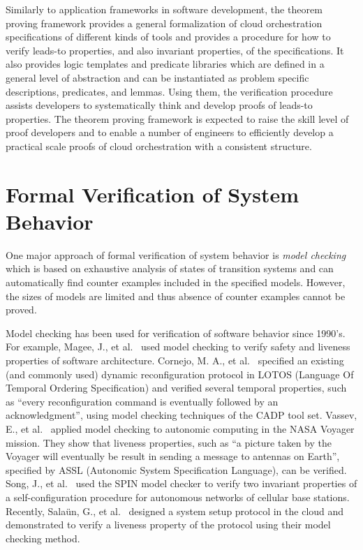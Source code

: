 \documentclass[12pt]{report}
\begin{document}
Similarly to application frameworks in software development, the
theorem proving framework provides a general formalization of cloud
orchestration specifications of different kinds of tools and provides
a procedure for how to verify leads-to properties, and also invariant
properties, of the specifications. It also provides logic templates
and predicate libraries which are defined in a general level of
abstraction and can be instantiated as problem specific descriptions,
predicates, and lemmas. Using them, the verification procedure assists
developers to systematically think and develop proofs of leads-to
properties.  The theorem proving framework is expected to raise the
skill level of proof developers and to enable a number of engineers to
efficiently develop a practical scale proofs of cloud orchestration
with a consistent structure.

\section{Formal Verification of System Behavior}
One major approach of formal verification of system behavior is {\it
  model checking} which is based on exhaustive analysis of states of
transition systems and can automatically find counter examples
included in the specified models. However, the sizes of models are
limited and thus absence of counter examples cannot be proved.

Model checking has been used for verification of software behavior
since 1990's.  For example, Magee, J., et al.~\cite{MageeKG99} used
model checking to verify safety and liveness properties of software
architecture. Cornejo, M. A., et al.~\cite{CornejoGMP01} specified an
existing (and commonly used) dynamic reconfiguration protocol in LOTOS
(Language Of Temporal Ordering Specification) and verified several
temporal properties, such as ``every reconfiguration command is
eventually followed by an acknowledgment'', using model checking
techniques of the CADP tool set. Vassev, E., et al.~\cite{VassevHQ09}
applied model checking to autonomic computing in the NASA Voyager
mission. They show that liveness properties, such as ``a picture taken
by the Voyager will eventually be result in sending a message to
antennas on Earth'', specified by ASSL (Autonomic System Specification
Language), can be verified. Song, J., et al.~\cite{song2010towards}
used the SPIN model checker to verify two invariant properties of a
self-configuration procedure for autonomous networks of cellular base
stations.  Recently, Sala{\"u}n, G., et al.~\cite{EtcheversCBP11,
  SalaunBCPEG13, SalaunEPBC13} designed a system setup protocol in the
cloud and demonstrated to verify a liveness property of the protocol
using their model checking method.
\end{document}

